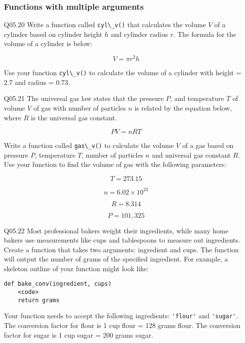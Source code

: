 \documentclass{book}
\newcommand{\passthrough}[1]{#1}
\begin{document}
    
        \hypertarget{functions-with-multiple-arguments}{%
\subsubsection{Functions with multiple
arguments}\label{functions-with-multiple-arguments}}

Q05.20 Write a function called \passthrough{\lstinline!cyl\_v()!} that
calculates the volume \(V\) of a cylinder based on cylinder height \(h\)
and cylinder radius \(r\). The formula for the volume of a cylinder is
below:

\[ V = \pi r^2 h \]

Use your function \passthrough{\lstinline!cyl\_v()!} to calculate the
volume of a cylinder with height = 2.7 and radius = 0.73.

Q05.21 The universal gas law states that the pressure \(P\), and
temperature \(T\) of volume \(V\) of gas with number of particles \(n\)
is related by the equation below, where \(R\) is the universal gas
constant.

\[ PV = nRT \]

Write a function called \passthrough{\lstinline!gas\_v()!} to calculate
the volume \(V\) of a gas based on pressure \(P\), temperature \(T\),
number of particles \(n\) and universal gas constant \(R\). Use your
function to find the volume of gas with the following parameters:

\[ T = 273.15\]

\[ n = 6.02 \times 10^{23} \]

\[ R = 8.314 \]

\[ P = 101,325 \]

Q05.22 Most professional bakers weight their ingredients, while many
home bakers use measurements like cups and tablespoons to measure out
ingredients. Create a function that takes two arguments: ingredient and
cups. The function will output the number of grams of the specified
ingredient. For example, a skeleton outline of your function might look
like:

\begin{lstlisting}
def bake_conv(ingredient, cups)
    <code>
    return grams
\end{lstlisting}

Your function needs to accept the following ingredients:
\passthrough{\lstinline!'flour'!} and \passthrough{\lstinline!'sugar'!}.
The conversion factor for flour is 1 cup flour = 128 grams flour. The
conversion factor for sugar is 1 cup sugar = 200 grams sugar.
\end{document}

